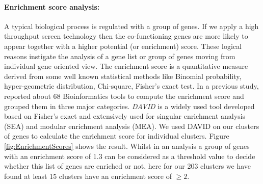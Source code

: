 \paragraph{Enrichment score analysis:}
A typical biological process is regulated with a group of genes. If we apply a high throughput screen technology then the co-functioning genes are more likely to appear together with a higher potential (or enrichment) score. These logical reasons instigate the analysis of a gene list or group of genes moving from individual gene oriented view. The enrichment score is a quantitative measure derived from some well known statistical methods like Binomial probability, hyper-geometric distribution, Chi-square, Fisher's exact test. In a previous study, \cite{Huang:2009Enrichment} reported about 68 Bioinformatics tools to compute the enrichment score and grouped them in three major categories. \emph{DAVID} \cite{Huang:2009David} is a widely used tool developed based on Fisher's exact and extensively used for singular enrichment analysis (SEA) and modular enrichment analysis (MEA). We used DAVID on our clusters of genes to calculate the enrichment score for individual clusters.  Figure \ref{fig:EnrichmentScores} shows the result. Whilst in an analysis a group of genes with an enrichment score of 1.3 can be considered as a threshold value to decide whether this list of genes are enriched or not, here for our 203 clusters we have found at least 15 clusters have an enrichment score of $\geq 2$.


